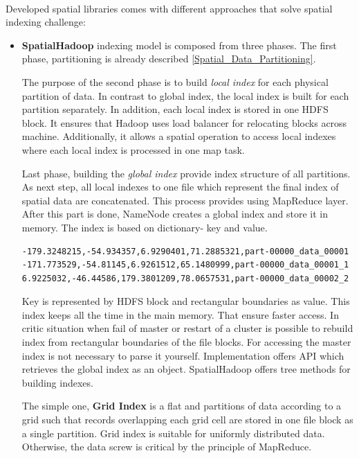 \documentclass[a4paper,12pt,oneside]{report}
\begin{document}
	\paragraph{} Developed spatial libraries comes with different approaches that
	solve  spatial indexing challenge:
	\begin{itemize}
		\item \textbf{SpatialHadoop} indexing model is composed from three phases. The
		first phase, partitioning is already
		described \ref{Spatial_Data_Partitioning}.
		
		The purpose of the second phase is to build \textit{local index}  for each
		physical partition of data. 
		In contrast to global index, the local index is built for each partition
		separately. In addition, each local 
		index is stored in one HDFS block. It ensures that Hadoop uses load balancer for
		relocating blocks 
		across machine. Additionally, it allows  a spatial operation to access local
		indexes where each local 
		index is processed in one map task. 
		
		Last phase, building the \textit{global index} provide index structure of all
		partitions. As next step, 
		all local indexes to one file which represent the final index of spatial data
		are concatenated. This process 
		provides using MapReduce  layer. After this part is done, NameNode creates a
		global index
		and store it in memory. The index is based on dictionary- key and value.
		
		\begin{footnotesize}
			\begin{lstlisting}[style=mybash]
-179.3248215,-54.934357,6.9290401,71.2885321,part-00000_data_00001
-171.773529,-54.81145,6.9261512,65.1480999,part-00000_data_00001_1
6.9225032,-46.44586,179.3801209,78.0657531,part-00000_data_00002_2
			\end{lstlisting}\end{footnotesize}
		
		
		Key is represented by HDFS block and  rectangular boundaries as value. This
		index keeps all the 
		time in the main memory. That ensure faster access. In critic situation when
		fail of master or 
		restart of a cluster is possible to rebuild index from rectangular boundaries of
		the file blocks. 
		For accessing the master index is not necessary to parse it yourself.
		Implementation offers API 
		which retrieves the global index as an object.
		SpatialHadoop offers tree methods for building indexes. 
		
		The simple one, \textbf{Grid Index} is a flat and partitions of
		data according to a grid such that records overlapping each grid cell are stored
		in one file block 
		as a single partition. Grid index is suitable for uniformly distributed data.
		Otherwise, the data 
		screw is critical by the principle of MapReduce. 
		

\end{itemize}
\end{document}
